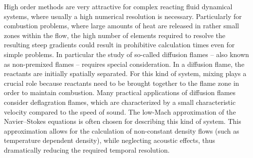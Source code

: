 High order methods are very attractive for complex reacting fluid dynamical systems, where usually a high numerical resolution is necessary. Particularly for combustion problems, where large amounts of heat are released in rather small zones within the flow, the high number of elements required to resolve the resulting steep gradients could result in prohibitive calculation times even for simple problems. In particular the study of so-called diffusion flames -- also known as non-premixed flames -- requires special consideration. In a diffusion flame, the reactants are initially spatially separated. For this kind of system, mixing plays a crucial role because reactants need to be brought together to the flame zone in order to maintain combustion. Many practical applications of diffusion flames consider deflagration flames, \cite{poinsotTheoreticalNumericalCombustion2005} which are characterized by a small characteristic velocity compared to the speed of sound. The low-Mach approximation of the Navier--Stokes equations is often chosen for describing this kind of system. This approximation allows for the calculation of non-constant density flows (such as temperature dependent density), while neglecting acoustic effects, thus dramatically reducing the required temporal resolution. \cite{mullerLowMachNumberAsymptoticsNavierStokes1998}

